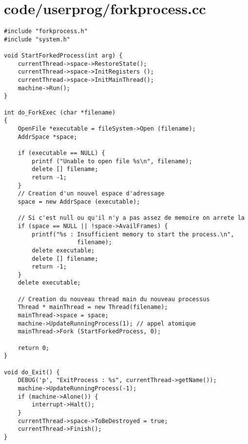 \documentclass[a4paper,10pt]{article}
\begin{document}
\section{code/userprog/forkprocess.cc}
\begin{lstlisting}
#include "forkprocess.h"
#include "system.h"

void StartForkedProcess(int arg) {
    currentThread->space->RestoreState();
    currentThread->space->InitRegisters ();
    currentThread->space->InitMainThread();
    machine->Run();
}

int do_ForkExec (char *filename)
{
    OpenFile *executable = fileSystem->Open (filename);
    AddrSpace *space;

    if (executable == NULL) {
        printf ("Unable to open file %s\n", filename);
        delete [] filename;
        return -1;
    }
    // Creation d'un nouvel espace d'adressage
    space = new AddrSpace (executable);

    // Si c'est null ou qu'il n'y a pas assez de memoire on arrete la
    if (space == NULL || !space->AvailFrames) {
        printf("%s : Insufficient memory to start the process.\n",
                     filename);
        delete executable;
        delete [] filename;
        return -1;
    }
    delete executable;

    // Creation du nouveau thread main du nouveau processus
    Thread * mainThread = new Thread(filename);
    mainThread->space = space;
    machine->UpdateRunningProcess(1); // appel atomique
    mainThread->Fork (StartForkedProcess, 0);

    return 0;
}

void do_Exit() {
    DEBUG('p', "ExitProcess : %s", currentThread->getName());
    machine->UpdateRunningProcess(-1);
    if (machine->Alone()) {
        interrupt->Halt();
    }
    currentThread->space->ToBeDestroyed = true;
    currentThread->Finish();
}
\end{lstlisting}
\end{document}
